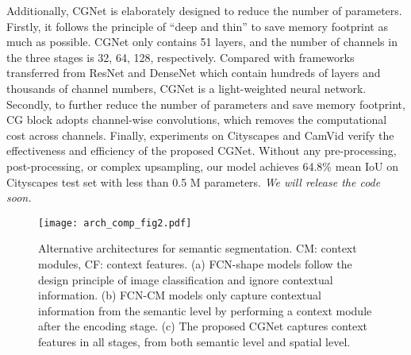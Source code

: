 \documentclass[10pt,twocolumn,letterpaper]{article}
\begin{document}
Additionally, CGNet is elaborately designed to reduce the number of parameters.
Firstly, it follows the principle of ``deep and thin'' to save memory footprint as much as possible. CGNet only contains 51 layers, and the number of channels in the three stages is 32, 64, 128, respectively. Compared with frameworks \cite{chen2018searching, Yu_2018_CVPR, Zhao_2017_CVPR, yang2018denseaspp} transferred from ResNet \cite{he2016deep} and DenseNet \cite{huang2017densely} which contain hundreds of layers and thousands of channel numbers, CGNet is a light-weighted neural network.
Secondly, to further reduce the number of parameters and save memory footprint, CG block adopts channel-wise convolutions, which removes the computational cost across channels. Finally, experiments on Cityscapes \cite{cordts2016cityscapes} and CamVid \cite{brostow2008segmentation} verify the  effectiveness and efficiency of the proposed CGNet. Without any pre-processing, post-processing, or complex upsampling, our model achieves 64.8\% mean IoU on Cityscapes test set with less than 0.5 M parameters. \emph{We will release the code soon.}




\begin{figure}[t]
\centering
\texttt{[image: arch\_comp\_fig2.pdf]}
\caption{Alternative architectures for semantic segmentation. CM: context modules, CF: context features.
(a) FCN-shape models follow the design principle of image classification and ignore contextual information. (b) FCN-CM models only capture contextual information from the semantic level by performing a context module after the encoding stage. (c) The proposed CGNet captures context features in all stages, from both semantic level and spatial level.
}
\label{fig:fig2}
\end{figure}
\end{document}
